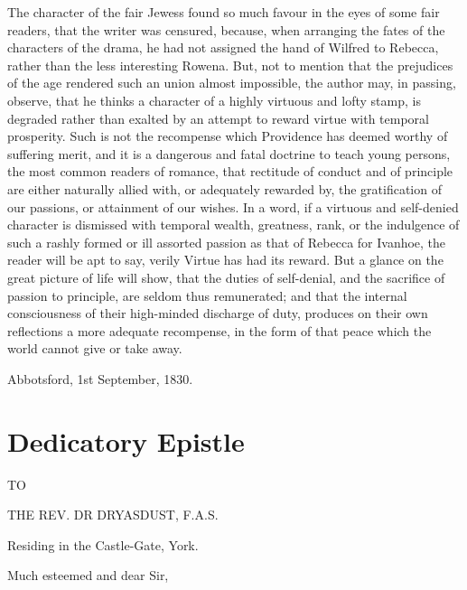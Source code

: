 The character of the fair Jewess found so much favour in the eyes of
some fair readers, that the writer was censured, because, when arranging
the fates of the characters of the drama, he had not assigned the hand
of Wilfred to Rebecca, rather than the less interesting Rowena. But, not
to mention that the prejudices of the age rendered such an union almost
impossible, the author may, in passing, observe, that he thinks a
character of a highly virtuous and lofty stamp, is degraded rather than
exalted by an attempt to reward virtue with temporal prosperity. Such is
not the recompense which Providence has deemed worthy of suffering
merit, and it is a dangerous and fatal doctrine to teach young persons,
the most common readers of romance, that rectitude of conduct and of
principle are either naturally allied with, or adequately rewarded by,
the gratification of our passions, or attainment of our wishes. In a
word, if a virtuous and self-denied character is dismissed with temporal
wealth, greatness, rank, or the indulgence of such a rashly formed or
ill assorted passion as that of Rebecca for Ivanhoe, the reader will be
apt to say, verily Virtue has had its reward. But a glance on the great
picture of life will show, that the duties of self-denial, and the
sacrifice of passion to principle, are seldom thus remunerated; and that
the internal consciousness of their high-minded discharge of duty,
produces on their own reflections a more adequate recompense, in the
form of that peace which the world cannot give or take away.

Abbotsford, 1st September, 1830.

\chapter{Dedicatory Epistle}

TO

THE REV. DR DRYASDUST, F.A.S.

Residing in the Castle-Gate, York.

Much esteemed and dear Sir,

